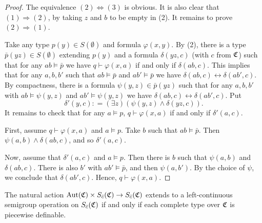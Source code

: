 	\begin{proof}
		The equivalence $(2) \Leftrightarrow (3)$ is obvious. It is also clear that $(1) \Rightarrow (2)$, by taking $z$ and $b$ to be empty in (2). It remains to prove $(2) \Rightarrow (1)$.
		
		Take any type $p(y) \in S(\emptyset)$ and formula $\varphi(x,y)$. By (2), there is a type $\bar p(yz) \in S(\emptyset)$ extending $p(y)$ and a formula $\delta(yz,c)$ (with $c$ from ${\mathfrak C}$) such that for any $ab \models \bar p$ we have $q\vdash \varphi(x,a)$ if and only if $\delta(ab,c)$. This implies that for any $a,b,b'$ such that $ab \models \bar p$ and $ab' \models \bar p$ we have $\delta(ab,c) \leftrightarrow \delta(ab',c)$. By compactness, there is a formula $\psi(y,z) \in \bar p(yz)$ such that for any $a,b,b'$ with $ab \models \psi(y,z)$ and $ab' \models \psi(y,z)$ we have $\delta(ab,c) \leftrightarrow \delta(ab',c)$. Put
		$$\delta'(y,c) : = (\exists z) (\psi(y,z) \wedge \delta(yz,c)).$$
		It remains to check that for any $a \models p$, $q\vdash \varphi(x,a)$ if and only if $\delta'(a,c)$.
		
		First, assume $q\vdash \varphi(x,a)$ and $a \models p$. Take $b$ such that $ab \models \bar p$. Then $\psi(a,b) \wedge \delta(ab,c)$, and so $\delta'(a,c)$.
		
		Now, assume that $\delta'(a,c)$ and $a \models p$. Then there is $b$ such that $\psi(a,b)$ and $\delta(ab,c)$. There is also $b'$ with $ab' \models \bar p$, and then $\psi(a,b')$. By the choice of $\psi$, we conclude that $\delta(ab',c)$. Hence, $q\vdash \varphi(x,a)$.
	\end{proof}
	
	
	
	
	\begin{cor}\label{cor: semigroup iff definability of types}
		The natural action $\operatorname{{Aut}}({\mathfrak C})\times S_{\bar c}({\mathfrak C})\to S_{\bar c}({\mathfrak C})$ extends to a left-continuous semigroup operation on $S_{\bar c}({\mathfrak C})$ if and only if each complete type over ${\mathfrak C}$ is piecewise definable.
	\end{cor}
	
